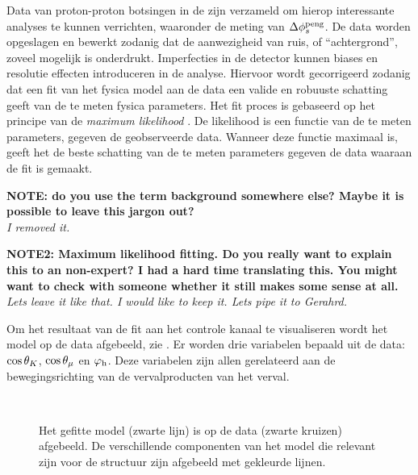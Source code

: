 Data van proton-proton botsingen in de \lhc zijn verzameld om hierop interessante analyses te kunnen verrichten, waaronder de meting van  $\Delta\phi_{s}^{\tiny\text{peng}}$. De data worden opgeslagen en bewerkt zodanig dat de aanwezigheid van ruis, of ``achtergrond'', zoveel mogelijk is onderdrukt. Imperfecties in de detector kunnen biases en resolutie effecten introduceren in de analyse. Hiervoor wordt gecorrigeerd zodanig dat een fit van het fysica model aan de data een valide en robuuste schatting geeft van de te meten fysica parameters. Het fit proces is gebaseerd op het principe van de {\it maximum likelihood} \cite{cowan1998statistical}. De likelihood is een functie van de te meten parameters, gegeven de geobserveerde data. Wanneer deze functie maximaal is, geeft het de beste schatting van de te meten parameters gegeven de data waaraan de fit is gemaakt.


\textbf{NOTE: do you use the term background somewhere else? Maybe it is possible to leave this jargon out?}\\
{\color{green}\it I removed it.}

\textbf{NOTE2: Maximum likelihood fitting. Do you really want to explain this to an non-expert?
I had a hard time translating this. You might want to check with someone whether it still makes some sense at all. }
{\color{green}\it Lets leave it like that. I would like to keep it. Lets pipe it to Gerahrd.}

Om het resultaat van de fit aan het \BsJpsiKst controle kanaal te visualiseren wordt het model op de data
afgebeeld, zie . Er worden drie variabelen bepaald uit de data: $\cos\theta_{K}$,
$\cos\theta_{\mu}$ en $\varphi_{\rm h}$. Deze variabelen zijn allen gerelateerd aan de bewegingsrichting van de vervalproducten
van het \BsJpsiKst verval.

\begin{figure}[!t]
  \begin{subfigure}{0.5\textwidth}
    \centering
    \scalebox{1.2}{}
  \end{subfigure}%
  \hfill
  \begin{subfigure}{0.5\textwidth}
    \centering
    \scalebox{1.2}{}
  \end{subfigure}\\
  \begin{subfigure}{\textwidth}
    \centering
    \scalebox{1.2}{}
  \end{subfigure}
  \caption{Het gefitte model (zwarte lijn) is op de \BsJpsiKst data (zwarte kruizen) afgebeeld. De verschillende componenten van het model die relevant zijn voor de \CP structuur zijn afgebeeld met gekleurde lijnen.}
  \label{app_angular_plot_thetas}
\end{figure}



